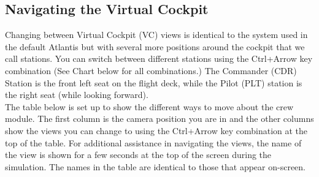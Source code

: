 \documentclass[13pt, letter,final]{article}
\begin{document}
\subsection*{Navigating the Virtual Cockpit}
Changing between Virtual Cockpit (VC) views is identical to the system used in the default Atlantis but with several more positions around the cockpit that we call stations. You can switch between different stations using the Ctrl+Arrow key combination (See Chart below for all combinations.) The Commander (CDR) Station is the front left seat on the flight deck, while the Pilot (PLT) station is the right seat (while looking forward).\\

The table below is set up to show the different ways to move about the crew module. The first column is the camera position you are in and the other columns show the views you can change to using the Ctrl+Arrow key combination at the top of the table. For additional assistance in navigating the views, the name of the view is shown for a few seconds at the top of the screen during the simulation. The names in the table are identical to those that appear on-screen.\\
\end{document}
